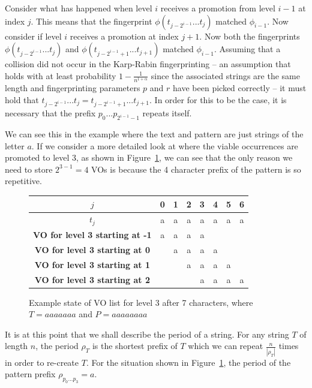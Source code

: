 \documentclass[ %
                    author={Dominic Joseph Moylett},
                    degree={MEng},
                     title={Dictionary Matching with Fingerprints},
                  subtitle={An Empirical Analysis},
                      type={Research},
                      year={2014} ]{dissertation}
\begin{document}
Consider what has happened when level $i$ receives a promotion from level $i-1$ at index $j$. This means that the fingerprint $\phi(t_{j - 2^{i-1}}...t_j)$ matched $\phi_{i-1}$. Now consider if level $i$ receives a promotion at index $j+1$. Now both the fingerprints $\phi(t_{j - 2^{i-1}}...t_j)$ and $\phi(t_{j - 2^{i-1} + 1}...t_{j + 1})$ matched $\phi_{i-1}$. Assuming that a collision did not occur in the Karp-Rabin fingerprinting -- an assumption that holds with at least probability $1 - \frac{1}{n^{1 + \alpha}}$ since the associated strings are the same length and fingerprinting parameters $p$ and $r$ have been picked correctly -- it must hold that $t_{j - 2^{i-1}}...t_j = t_{j - 2^{i-1} + 1}...t_{j + 1}$. In order for this to be the case, it is necessary that the prefix $p_0...p_{2^{i-1} - 1}$ repeats itself.

We can see this in the example where the text and pattern are just strings of the letter $a$. If we consider a more detailed look at where the viable occurrences are promoted to level 3, as shown in Figure~\ref{fig:pp-level-3}, we can see that the only reason we need to store $2^{3-1} = 4$ VOs is because the 4 character prefix of the pattern is so repetitive.

\begin{figure}[t]
\centering
\begin{tabular}{|c|c c c c c c c|}
  \hline
  $j$ & 0 & 1 & 2 & 3 & 4 & 5 & 6 \\
  \hline
  $t_j$ & a & a & a & a & a & a & a \\
  \hline
  \textbf{VO for level 3 starting at -1} & a & a & a & a &  &  &  \\
  \hline
  \textbf{VO for level 3 starting at 0} &  & a & a & a & a &  &  \\
  \hline
  \textbf{VO for level 3 starting at 1} &  &  & a & a & a & a &  \\
  \hline
  \textbf{VO for level 3 starting at 2} &  &  &  & a & a & a & a \\
  \hline
\end{tabular}
\caption{Example state of VO list for level 3 after 7 characters, where $T = aaaaaaa$ and $P = aaaaaaaa$}
\label{fig:pp-level-3}
\end{figure}

It is at this point that we shall describe the period of a string. For any string $T$ of length $n$, the period $\rho_T$ is the shortest prefix of $T$ which we can repeat $\frac{n}{|\rho_T|}$ times in order to re-create $T$. For the situation shown in Figure~\ref{fig:pp-level-3}, the period of the pattern prefix $\rho_{p_0...p_3} = a$.
\end{document}
